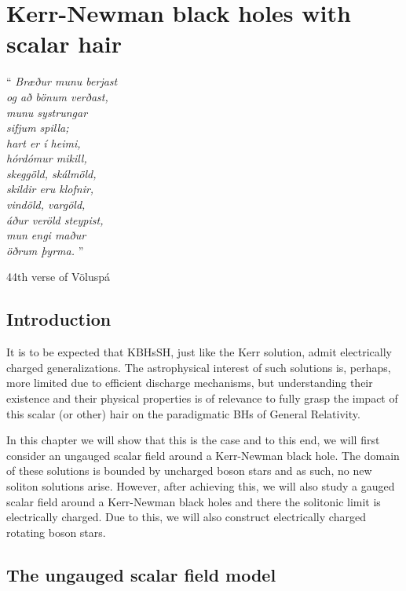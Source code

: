 \chapter{Kerr-Newman black holes with scalar hair}
\label{ch:KN}

\epigraph{``\emph{
Bræður munu berjast \\
og að bönum verðast, \\
munu systrungar \\
sifjum spilla; \\
hart er í heimi, \\
hórdómur mikill, \\
skeggöld, skálmöld, \\
skildir eru klofnir, \\
vindöld, vargöld, \\
áður veröld steypist, \\
mun engi maður \\
öðrum þyrma. 
} 
''}{44th verse of Völuspá}


\section{Introduction}

It is to be expected that KBHsSH, just like the Kerr solution, admit electrically charged generalizations.
The astrophysical interest of such solutions is, perhaps, more limited due to efficient discharge mechanisms, but understanding their existence and their physical properties is of relevance to fully grasp the impact of this scalar (or other) hair on the paradigmatic BHs of General Relativity.

In this chapter we will show that this is the case and to this end, we will first consider an ungauged scalar field around a Kerr-Newman black hole.
The domain of these solutions is bounded by uncharged boson stars and as such, no new soliton solutions arise.
However, after achieving this, we will also study a gauged scalar field around a Kerr-Newman black holes and there the solitonic limit is electrically charged.
Due to this, we will also construct electrically charged rotating boson stars.

\section{The ungauged scalar field model}
\label{sec_mod_u}
